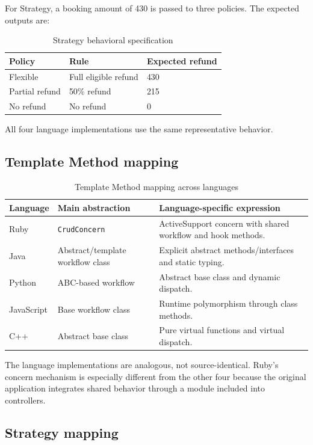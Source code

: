 \documentclass[10pt,a4paper]{article}
\newcommand{\code}[1]{\texttt{\small #1}}
\begin{document}
For Strategy, a booking amount of 430 is passed to three policies. The expected outputs are:

\begin{table}[H]
\centering
\caption{Strategy behavioral specification}
\label{tab:strategy-spec}
\begin{tabular}{lll}
\toprule
Policy & Rule & Expected refund\\
\midrule
Flexible & Full eligible refund & 430\\
Partial refund & 50\% refund & 215\\
No refund & No refund & 0\\
\bottomrule
\end{tabular}
\end{table}

All four language implementations use the same representative behavior.

\subsection{Template Method mapping}

\begin{table}[H]
\centering
\caption{Template Method mapping across languages}
\label{tab:tm-language}
\begin{tabularx}{\linewidth}{lXX}
\toprule
Language & Main abstraction & Language-specific expression\\
\midrule
Ruby & \code{CrudConcern} & ActiveSupport concern with shared workflow and hook methods.\\
Java & Abstract/template workflow class & Explicit abstract methods/interfaces and static typing.\\
Python & ABC-based workflow & Abstract base class and dynamic dispatch.\\
JavaScript & Base workflow class & Runtime polymorphism through class methods.\\
C++ & Abstract base class & Pure virtual functions and virtual dispatch.\\
\bottomrule
\end{tabularx}
\end{table}

The language implementations are analogous, not source-identical. Ruby's concern mechanism is especially different from the other four because the original application integrates shared behavior through a module included into controllers.

\subsection{Strategy mapping}
\end{document}
